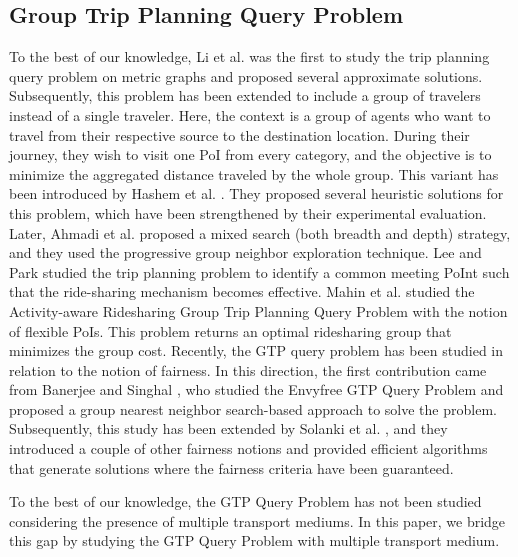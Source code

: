 \subsection{Group Trip Planning Query Problem}
To the best of our knowledge, Li et al. \cite{li2005trip} was the first to study the trip planning query problem on metric graphs and proposed several approximate solutions. Subsequently, this problem has been extended to include a group of travelers instead of a single traveler. Here, the context is a group of agents who want to travel from their respective source to the destination location. During their journey, they wish to visit one PoI from every category, and the objective is to minimize the aggregated distance traveled by the whole group. This variant has been introduced by Hashem et al. \cite{hashem2013group}. They proposed several heuristic solutions for this problem, which have been strengthened by their experimental evaluation. Later, Ahmadi et al. \cite{ahmadi2015mixed} proposed a mixed search (both breadth and depth) strategy, and they used the progressive group neighbor exploration technique. Lee and Park  \cite{lee2020collective} studied the trip planning problem to identify a common meeting PoInt such that the ride-sharing mechanism becomes effective. Mahin et al. \cite{mahin2019activity} studied the Activity-aware Ridesharing Group Trip Planning Query Problem with the notion of flexible PoIs. This problem returns an optimal ridesharing group that minimizes the group cost. Recently, the GTP query problem has been studied in relation to the notion of fairness. In this direction, the first contribution came from Banerjee and Singhal \cite{singhal2022envy}, who studied the Envyfree GTP Query Problem and proposed a group nearest neighbor search-based approach to solve the problem. Subsequently, this study has been extended by Solanki et al. \cite{solanki2023fairness}, and they introduced a couple of other fairness notions and provided efficient algorithms that generate solutions where the fairness criteria have been guaranteed.
\par To the best of our knowledge, the GTP Query Problem has not been studied considering the presence of multiple transport mediums. In this paper, we bridge this gap by studying the GTP Query Problem with multiple transport medium.